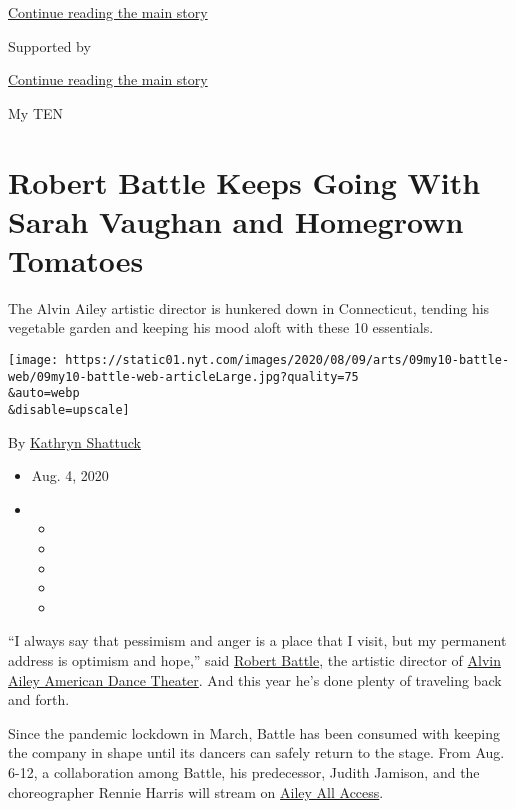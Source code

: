\protect\hyperlink{after-top}{Continue reading the main story}

Supported by

\protect\hyperlink{after-sponsor}{Continue reading the main story}

My TEN

\hypertarget{robert-battle-keeps-going-with-sarah-vaughan-and-homegrown-tomatoes}{%
\section{Robert Battle Keeps Going With Sarah Vaughan and Homegrown
Tomatoes}\label{robert-battle-keeps-going-with-sarah-vaughan-and-homegrown-tomatoes}}

The Alvin Ailey artistic director is hunkered down in Connecticut,
tending his vegetable garden and keeping his mood aloft with these 10
essentials.

\texttt{[image: https://static01.nyt.com/images/2020/08/09/arts/09my10-battle-web/09my10-battle-web-articleLarge.jpg?quality=75\\\&auto=webp\\\&disable=upscale]}

By \href{https://www.nytimes.com/by/kathryn-shattuck}{Kathryn Shattuck}

\begin{itemize}
\item
  Aug. 4, 2020
\item
  \begin{itemize}
  \item
  \item
  \item
  \item
  \item
  \end{itemize}
\end{itemize}

``I always say that pessimism and anger is a place that I visit, but my
permanent address is optimism and hope,'' said
\href{https://www.alvinailey.org/alvin-ailey-american-dance-theater/robert-battle}{Robert
Battle}, the artistic director of
\href{https://www.alvinailey.org/}{Alvin Ailey American Dance Theater}.
And this year he's done plenty of traveling back and forth.

Since the pandemic lockdown in March, Battle has been consumed with
keeping the company in shape until its dancers can safely return to the
stage. From Aug. 6-12, a collaboration among Battle, his predecessor,
Judith Jamison, and the choreographer Rennie Harris will stream on
\href{https://www.alvinailey.org/performances-tickets/ailey-all-access}{Ailey
All Access}.

